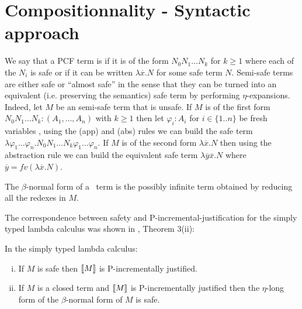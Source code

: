 \section{Compositionnality - Syntactic approach}

We say that a PCF term is  if it is of the form $N_0 N_1 \ldots N_k$ for $k\geq 1$ where each of the $N_i$ is safe or if it can be written $\lambda \overline{x} . N$ for some safe term $N$. Semi-safe terms are either safe or ``almost safe'' in the sense that they can be turned into an equivalent (i.e. preserving the semantics) safe term  by performing $\eta$-expansions. Indeed, let $M$ be an semi-safe term that is unsafe.
If $M$ is of the first form $N_0 N_1 \ldots N_k : (A_1,\ldots,A_n)$ with $k\geq 1$ then let $\varphi_i:A_i$ for $i\in\{1..n\}$ be fresh variables , using the (app) and (abs) rules we can build the safe term $\lambda \varphi_1 \ldots \varphi_n . N_0 N_1 \ldots N_k \varphi_1 \ldots \varphi_n$. If $M$ is of the second form $\lambda \overline{x} . N$ then using the abstraction rule we can build the equivalent safe term $\lambda \overline{y} \overline{x}. N$  where $\overline{y} = fv(\lambda \overline{x}. N)$.

The $\beta$-normal form of a \pcf\ term is the possibly infinite term obtained by reducing all the redexes in $M$.



The correspondence between safety and P-incremental-justification for the simply typed lambda calculus was shown
in \cite{blumong:safelambdacalculus}, Theorem 3(ii):

\begin{theorem}
\label{thm:safeincrejust} In the simply typed lambda calculus:
\begin{enumerate}[(i)]
\item If $M$ is safe then ${[\![ M ]\!]}$ is P-incrementally justified.
\item If $M$ is a closed term and ${[\![ M ]\!]}$ is
  P-incrementally justified then the $\eta$-long form of the
  $\beta$-normal form of $M$ is safe.
\end{enumerate}
\end{theorem}

